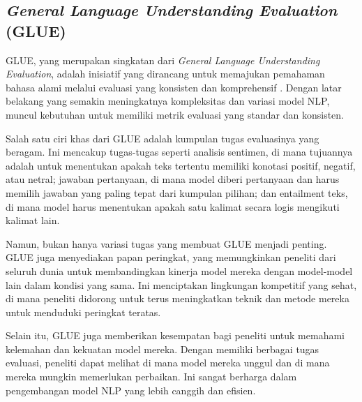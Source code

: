 \subsection{\textit{General Language Understanding Evaluation} (GLUE)}

GLUE, yang merupakan singkatan dari \textit{General Language Understanding Evaluation}, adalah inisiatif yang dirancang untuk memajukan pemahaman bahasa alami melalui evaluasi yang konsisten dan komprehensif \parencite{glue}. Dengan latar belakang yang semakin meningkatnya kompleksitas dan variasi model NLP, muncul kebutuhan untuk memiliki metrik evaluasi yang standar dan konsisten. 

Salah satu ciri khas dari GLUE adalah kumpulan tugas evaluasinya yang beragam. Ini mencakup tugas-tugas seperti analisis sentimen, di mana tujuannya adalah untuk menentukan apakah teks tertentu memiliki konotasi positif, negatif, atau netral; jawaban pertanyaan, di mana model diberi pertanyaan dan harus memilih jawaban yang paling tepat dari kumpulan pilihan; dan entailment teks, di mana model harus menentukan apakah satu kalimat secara logis mengikuti kalimat lain.

Namun, bukan hanya variasi tugas yang membuat GLUE menjadi penting. GLUE juga menyediakan papan peringkat, yang memungkinkan peneliti dari seluruh dunia untuk membandingkan kinerja model mereka dengan model-model lain dalam kondisi yang sama. Ini menciptakan lingkungan kompetitif yang sehat, di mana peneliti didorong untuk terus meningkatkan teknik dan metode mereka untuk menduduki peringkat teratas.

Selain itu, GLUE juga memberikan kesempatan bagi peneliti untuk memahami kelemahan dan kekuatan model mereka. Dengan memiliki berbagai tugas evaluasi, peneliti dapat melihat di mana model mereka unggul dan di mana mereka mungkin memerlukan perbaikan. Ini sangat berharga dalam pengembangan model NLP yang lebih canggih dan efisien.